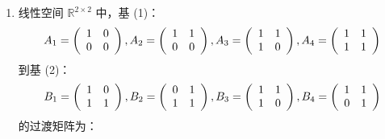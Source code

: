 \begin{enumerate}[1~]
\begin{enumerate}[1.~]
\item
线性空间 $\mathbb{R}^{2\times2}$ 中，基 (1)：
$$
A _ { 1 } = \left( \begin{array} { c c } { 1 } & { 0 } \\ { 0 } & { 0 } \end{array} \right) , A _ { 2 } = \left( \begin{array} { c c } { 1 } & { 1 } \\ { 0 } & { 0 } \end{array} \right) , A _ { 3 } = \left( \begin{array} { c c } { 1 } & { 1 } \\ { 1 } & { 0 } \end{array} \right) , A _ { 4 } = \left( \begin{array} { c c } { 1 } & { 1 } \\ { 1 } & { 1 } \end{array} \right)
$$
到基 (2)：
$$
B _ { 1 } = \left( \begin{array} { c c } { 1 } & { 0 } \\ { 1 } & { 1 } \end{array} \right) , B _ { 2 } = \left( \begin{array} { c c } { 0 } & { 1 } \\ { 1 } & { 1 } \end{array} \right) , B _ { 3 } = \left( \begin{array} { c c } { 1 } & { 1 } \\ { 1 } & { 0 } \end{array} \right) , B _ { 4 } = \left( \begin{array} { c c } { 1 } & { 1 } \\ { 0 } & { 1 } \end{array} \right)
$$
的过渡矩阵为：


\end{enumerate}
\end{enumerate}
